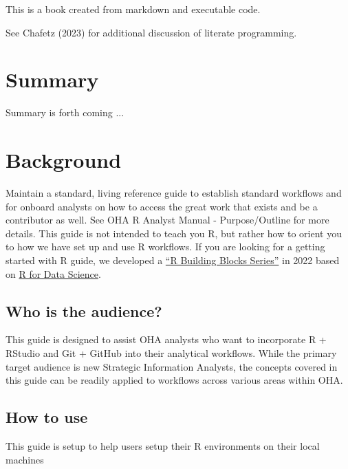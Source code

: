 \documentclass[
  letterpaper,
  DIV=11,
  numbers=noendperiod]{scrreprt}
\begin{document}
This is a book created from markdown and executable code.

See Chafetz (2023) for additional discussion of literate programming.


\hypertarget{summary}{%
\chapter{Summary}\label{summary}}

Summary is forth coming ...


\hypertarget{background}{%
\chapter{Background}\label{background}}

Maintain a standard, living reference guide to establish standard
workflows and for onboard analysts on how to access the great work that
exists and be a contributor as well. See OHA R Analyst Manual -
Purpose/Outline for more details. This guide is not intended to teach
you R, but rather how to orient you to how we have set up and use R
workflows. If you are looking for a getting started with R guide, we
developed a
\href{https://usaid-oha-si.github.io/learn/categories/\#rbbs}{``R
Building Blocks Series''} in 2022 based on
\href{https://r4ds.had.co.nz/}{R for Data Science}.

\hypertarget{who-is-the-audience}{%
\section{Who is the audience?}\label{who-is-the-audience}}

This guide is designed to assist OHA analysts who want to incorporate R
+ RStudio and Git + GitHub into their analytical workflows. While the
primary target audience is new Strategic Information Analysts, the
concepts covered in this guide can be readily applied to workflows
across various areas within OHA.

\hypertarget{how-to-use}{%
\section{How to use}\label{how-to-use}}

This guide is setup to help users setup their R environments on their
local machines
\end{document}
